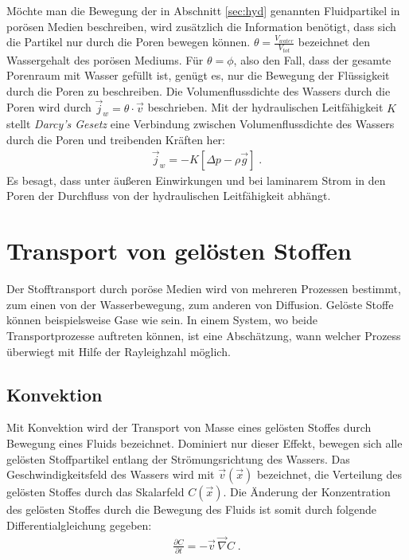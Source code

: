 Möchte man die Bewegung der in Abschnitt \ref{sec:hyd} genannten Fluidpartikel in porösen Medien beschreiben, wird zusätzlich die Information benötigt, dass sich die Partikel nur durch die Poren bewegen können.
\mbox{$\theta = \frac{V_{water}}{V_{tot}}$} bezeichnet den Wassergehalt des porösen Mediums. Für $\theta = \phi$, also den Fall, dass der gesamte Porenraum mit Wasser gefüllt ist, genügt es, nur die Bewegung der Flüssigkeit durch die Poren zu beschreiben. Die Volumenflussdichte des Wassers durch die Poren wird durch $\vec{j}_w = \theta \cdot \vec{v}$ beschrieben. 
Mit der hydraulischen Leitfähigkeit $K$ stellt \textit{Darcy's Gesetz} eine Verbindung zwischen Volumenflussdichte des Wassers durch die Poren und treibenden Kräften her:
\begin{align}
 \vec{j}_w = -K \left[ \Delta p - \rho \vec{g} \right] \; .
 \label{darcy}
\end{align}
Es besagt, dass unter äußeren Einwirkungen und bei laminarem Strom in den Poren der Durchfluss von der hydraulischen Leitfähigkeit abhängt.

\section{Transport von gelösten Stoffen}
\label{sec:soltra}
Der Stofftransport durch poröse Medien wird von mehreren Prozessen bestimmt, zum einen von der Wasserbewegung, zum anderen von Diffusion.
Gelöste Stoffe können beispielsweise Gase wie \COT sein.
In einem System, wo beide Transportprozesse auftreten können, ist eine Abschätzung, wann welcher Prozess überwiegt mit Hilfe der Rayleighzahl möglich.

\subsection{Konvektion}
\label{sec:conv}
Mit Konvektion wird der Transport von Masse eines gelösten Stoffes durch Bewegung eines Fluids bezeichnet. Dominiert nur dieser Effekt, bewegen sich alle gelösten Stoffpartikel entlang der Strömungsrichtung des Wassers.
Das Geschwindigkeitsfeld des Wassers wird mit $\vec{v}(\vec{x})$ bezeichnet, die Verteilung des gelösten Stoffes durch das Skalarfeld $C(\vec{x})$. 
Die Änderung der Konzentration des gelösten Stoffes durch die Bewegung des Fluids ist somit durch folgende Differentialgleichung gegeben:
\begin{align}
 \frac{\partial C}{\partial t} = -\vec{v} \, \vec{\nabla}C \; .
 \label{eq:konv}
\end{align}


